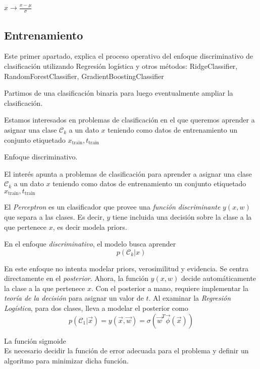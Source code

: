 \documentclass[twoside,11pt]{article}
\begin{document}
$x\rightarrow \frac{x-\mu}{\sigma}$

\subsection{Entrenamiento}

Este primer apartado, explica el proceso operativo del enfoque discriminativo de clasificación
utilizando Regresión logística y otros métodos: RidgeClassifier, RandomForestClassifier, GradientBoostingClassifier

Partimos de una clasificación binaria para luego eventualmente ampliar la clasificación.


Estamos interesados en problemas de clasificación en el que queremos aprender a asignar 
una clase $\mathcal{C}_{k}$ a un dato $x$ teniendo como datos de entrenamiento un conjunto 
etiquetado $x_{\text{train}},t_{\text{train}}$

Enfoque discriminativo.

El interés apunta a problemas de clasificación para aprender a asignar una clase $\mathcal{C}_{k}$
a un dato $x$ teniendo como datos de entrenamiento un conjunto etiquetado $x_{\text{train}},t_{\text{train}}$

El \textit{Perceptron} es un clasificador que provee una \textit{función discriminante} $y(x,w)$ que separa a
las clases. Es decir, $y$ tiene incluida una decisión sobre la clase a la que pertenece $x$, es decir modela 
priors.

En el enfoque \textit{discriminativo}, el modelo busca aprender\\

$$p(\mathcal{C}_{k}|x)$$

En este enfoque no intenta modelar priors, verosimilitud y evidencia. Se centra directamente 
en el \textit{posterior}. Ahora, la función $y(x,w)$ decide automáticamente la clase a la que pertenece $x$. 
Con el posterior a mano, requiere implementar la \textit{teoría de la decisión} para asignar un valor de $t$.
Al examinar la \textit{Regresión Logística}, para dos clases, lleva a modelar el posterior como\\

$$p(\mathcal{C}_{1}|\vec{x})=y(\vec{x},\vec{w})=\sigma(\vec{w}^{T}\vec{\phi}(\vec{x}))$$

La función sigmoide\\
Es necesario decidir la función de error adecuada para el problema y definir un algoritmo para minimizar dicha función.
\end{document}
